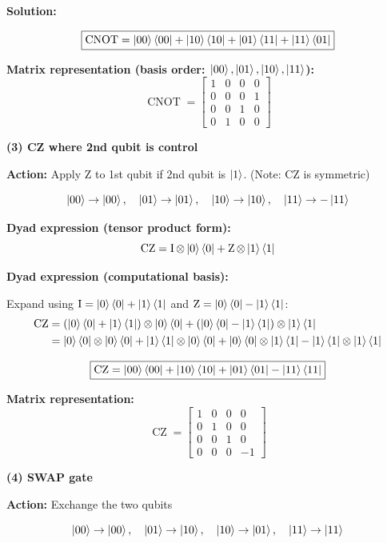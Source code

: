 \documentclass[11pt]{article}
\newenvironment{solution}
{\par\noindent\textbf{Solution:}\par}
{\vspace{1em}}
\begin{document}
\begin{solution}
\[\boxed{\operatorname{CNOT} = \ket{00}\bra{00} + \ket{10}\bra{10} + \ket{01}\bra{11} + \ket{11}\bra{01}}\]

\textbf{Matrix representation (basis order: $\ket{00}, \ket{01}, \ket{10}, \ket{11}$):}
\[\boxed{\operatorname{CNOT} = \begin{bmatrix}1 & 0 & 0 & 0 \\ 0 & 0 & 0 & 1 \\ 0 & 0 & 1 & 0 \\ 0 & 1 & 0 & 0\end{bmatrix}}\]

\textbf{(3) CZ where 2nd qubit is control}

\textbf{Action:} Apply Z to 1st qubit if 2nd qubit is $\ket{1}$. (Note: CZ is symmetric)

\[\ket{00} \to \ket{00}, \quad \ket{01} \to \ket{01}, \quad \ket{10} \to \ket{10}, \quad \ket{11} \to -\ket{11}\]

\textbf{Dyad expression (tensor product form):}
\[\operatorname{CZ} = \operatorname{I} \otimes \ket{0}\bra{0} + \operatorname{Z} \otimes \ket{1}\bra{1}\]

\textbf{Dyad expression (computational basis):}

Expand using $\operatorname{I} = \ket{0}\bra{0} + \ket{1}\bra{1}$ and $\operatorname{Z} = \ket{0}\bra{0} - \ket{1}\bra{1}$:
\[\begin{aligned}
\operatorname{CZ} &= (\ket{0}\bra{0} + \ket{1}\bra{1}) \otimes \ket{0}\bra{0} + (\ket{0}\bra{0} - \ket{1}\bra{1}) \otimes \ket{1}\bra{1} \\
&= \ket{0}\bra{0} \otimes \ket{0}\bra{0} + \ket{1}\bra{1} \otimes \ket{0}\bra{0} + \ket{0}\bra{0} \otimes \ket{1}\bra{1} - \ket{1}\bra{1} \otimes \ket{1}\bra{1}
\end{aligned}\]

\[\boxed{\operatorname{CZ} = \ket{00}\bra{00} + \ket{10}\bra{10} + \ket{01}\bra{01} - \ket{11}\bra{11}}\]

\textbf{Matrix representation:}
\[\boxed{\operatorname{CZ} = \begin{bmatrix}1 & 0 & 0 & 0 \\ 0 & 1 & 0 & 0 \\ 0 & 0 & 1 & 0 \\ 0 & 0 & 0 & -1\end{bmatrix}}\]

\textbf{(4) SWAP gate}

\textbf{Action:} Exchange the two qubits

\[\ket{00} \to \ket{00}, \quad \ket{01} \to \ket{10}, \quad \ket{10} \to \ket{01}, \quad \ket{11} \to \ket{11}\]


\end{solution}
\end{document}
